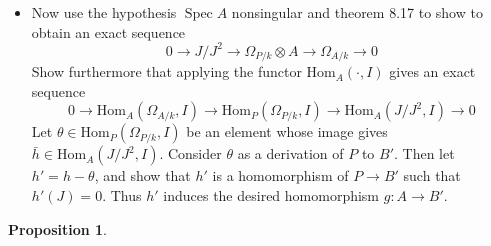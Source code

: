 \documentclass[a4paper,12pt]{amsart}
\theoremstyle{definition}
\theoremstyle{plain}
\newtheorem{prop}{Proposition}[subsection]
\DeclareMathOperator{\spec}{Spec}
\renewcommand{\hom}{\text{Hom}}
\begin{document}
\begin{itemize}
\begin{proof}
	\end{proof}
	\item Now use the hypothesis $\spec A$ nonsingular and theorem 8.17 to show to obtain an exact sequence
	\[
	0 \to J/J^2 \to \Omega_{P/k} \otimes A \to \Omega_{A/k} \to 0
	\]
	Show furthermore that applying the functor $\hom_A(\cdot, I)$ gives an exact sequence
	\[
	0 \to \hom_A(\Omega_{A/k},I) \to \hom_{P}(\Omega_{P/k},I) \to \hom_A(J/J^2,I) \to 0
	\]
	Let $\theta \in \hom_P(\Omega_{P/k},I)$ be an element whose image gives $ \bar{h} \in \hom_A(J/J^2,I)$. Consider $\theta$ as a derivation of $P$ to $B'$. Then let $h'= h - \theta$, and show that $h'$ is a homomorphism of $P \to B'$ such that $h'(J)=0$. Thus $h'$ induces the desired homomorphism $g \colon A \to B'$.
	\end{itemize}
\begin{prop}

\end{prop}
\end{document}
